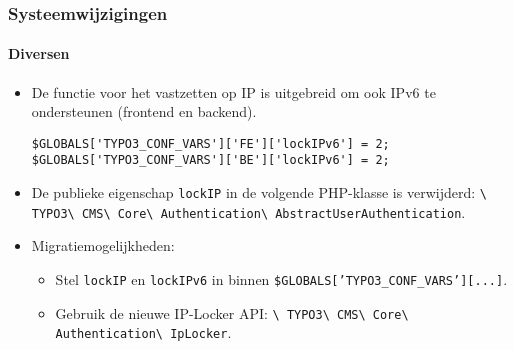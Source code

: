 
\begin{frame}[fragile]
	\frametitle{Systeemwijzigingen}
	\framesubtitle{Diversen}

	\lstset{basicstyle=\tiny\ttfamily}

	\begin{itemize}

		\item De functie voor het vastzetten op IP is uitgebreid om ook IPv6 te ondersteunen
			(frontend en backend).
\begin{lstlisting}
$GLOBALS['TYPO3_CONF_VARS']['FE']['lockIPv6'] = 2;
$GLOBALS['TYPO3_CONF_VARS']['BE']['lockIPv6'] = 2;
\end{lstlisting}

		\item De publieke eigenschap \texttt{lockIP} in de volgende PHP-klasse is verwijderd:\newline
			\small
				\texttt{\textbackslash
					TYPO3\textbackslash
					CMS\textbackslash
					Core\textbackslash
					Authentication\textbackslash
					AbstractUserAuthentication}.
			\normalsize

		\item Migratiemogelijkheden:

			\begin{itemize}\smaller
				\item[\ding{228}] Stel \texttt{lockIP} en \texttt{lockIPv6} in binnen \texttt{\$GLOBALS['TYPO3\_CONF\_VARS'][...]}.
				\item[\ding{228}] Gebruik de nieuwe IP-Locker API:
					\texttt{\textbackslash
						TYPO3\textbackslash
						CMS\textbackslash
						Core\textbackslash
						Authentication\textbackslash
						IpLocker}.
			\end{itemize}\normalsize

	\end{itemize}

\end{frame}

